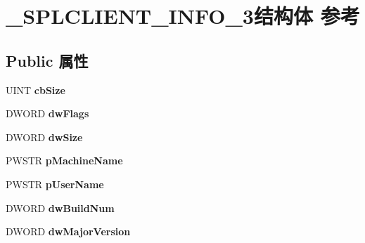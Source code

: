 \hypertarget{struct___s_p_l_c_l_i_e_n_t___i_n_f_o__3}{}\section{\+\_\+\+S\+P\+L\+C\+L\+I\+E\+N\+T\+\_\+\+I\+N\+F\+O\+\_\+3结构体 参考}
\label{struct___s_p_l_c_l_i_e_n_t___i_n_f_o__3}
\subsection*{Public 属性}
\begin{DoxyCompactItemize}
\item 
\mbox{\label{struct___s_p_l_c_l_i_e_n_t___i_n_f_o__3_ad62a3de957ca3e036e39c143022620cb}} 
U\+I\+NT {\bfseries cb\+Size}
\item 
\mbox{\label{struct___s_p_l_c_l_i_e_n_t___i_n_f_o__3_a5122d3f38535b4892cb2324d4e875b04}} 
D\+W\+O\+RD {\bfseries dw\+Flags}
\item 
\mbox{\label{struct___s_p_l_c_l_i_e_n_t___i_n_f_o__3_a7f1bb24296576c21e0c4fb2109cf9dab}} 
D\+W\+O\+RD {\bfseries dw\+Size}
\item 
\mbox{\label{struct___s_p_l_c_l_i_e_n_t___i_n_f_o__3_a3a68091e4974306ea95a90d50461ccd5}} 
P\+W\+S\+TR {\bfseries p\+Machine\+Name}
\item 
\mbox{\label{struct___s_p_l_c_l_i_e_n_t___i_n_f_o__3_a11843c1dee4cbf83e383855dbed7bb40}} 
P\+W\+S\+TR {\bfseries p\+User\+Name}
\item 
\mbox{\label{struct___s_p_l_c_l_i_e_n_t___i_n_f_o__3_ad55ec683c8b012c1f5c44e71a0877fb0}} 
D\+W\+O\+RD {\bfseries dw\+Build\+Num}
\item 
\mbox{\label{struct___s_p_l_c_l_i_e_n_t___i_n_f_o__3_af977267f0df8219817f3f43830c3a8d3}} 
D\+W\+O\+RD {\bfseries dw\+Major\+Version}
\item 
\mbox{\label{struct___s_p_l_c_l_i_e_n_t___i_n_f_o__3_afc5c9b52962bfb8ddf4cb5fc5125a446}} 

\end{DoxyCompactItemize}
